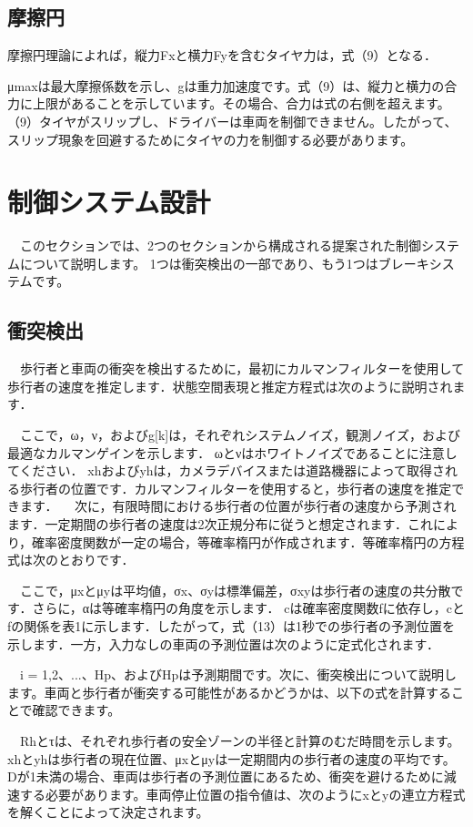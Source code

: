 \subsection{摩擦円}
摩擦円理論によれば，縦力Fxと横力Fyを含むタイヤ力は，式（9）となる．

μmaxは最大摩擦係数を示し、gは重力加速度です。式（9）は、縦力と横力の合力に上限があることを示しています。その場合、合力は式の右側を超えます。 （9）タイヤがスリップし、ドライバーは車両を制御できません。したがって、スリップ現象を回避するためにタイヤの力を制御する必要があります。

\section{制御システム設計}
　このセクションでは、2つのセクションから構成される提案された制御システムについて説明します。 1つは衝突検出の一部であり、もう1つはブレーキシステムです。

\subsection{衝突検出}
　歩行者と車両の衝突を検出するために，最初にカルマンフィルターを使用して歩行者の速度を推定します．状態空間表現と推定方程式は次のように説明されます．

　ここで，ω，ν，およびg[k]は，それぞれシステムノイズ，観測ノイズ，および最適なカルマンゲインを示します． ωとνはホワイトノイズであることに注意してください． xhおよびyhは，カメラデバイスまたは道路機器によって取得される歩行者の位置です．カルマンフィルターを使用すると，歩行者の速度を推定できます．
　次に，有限時間における歩行者の位置が歩行者の速度から予測されます．一定期間の歩行者の速度は2次正規分布に従うと想定されます．これにより，確率密度関数が一定の場合，等確率楕円が作成されます．等確率楕円の方程式は次のとおりです．

　ここで，μxとμyは平均値，σx、σyは標準偏差，σxyは歩行者の速度の共分散です．さらに，αは等確率楕円の角度を示します． cは確率密度関数fに依存し，cとfの関係を表1に示します．したがって，式（13）は1秒での歩行者の予測位置を示します．一方，入力なしの車両の予測位置は次のように定式化されます．

　i = 1,2、...、Hp、およびHpは予測期間です。次に、衝突検出について説明します。車両と歩行者が衝突する可能性があるかどうかは、以下の式を計算することで確認できます。

　Rhとτは、それぞれ歩行者の安全ゾーンの半径と計算のむだ時間を示します。 xhとyhは歩行者の現在位置、μxとμyは一定期間内の歩行者の速度の平均です。 Dが1未満の場合、車両は歩行者の予測位置にあるため、衝突を避けるために減速する必要があります。車両停止位置の指令値は、次のようにxとyの連立方程式を解くことによって決定されます。

